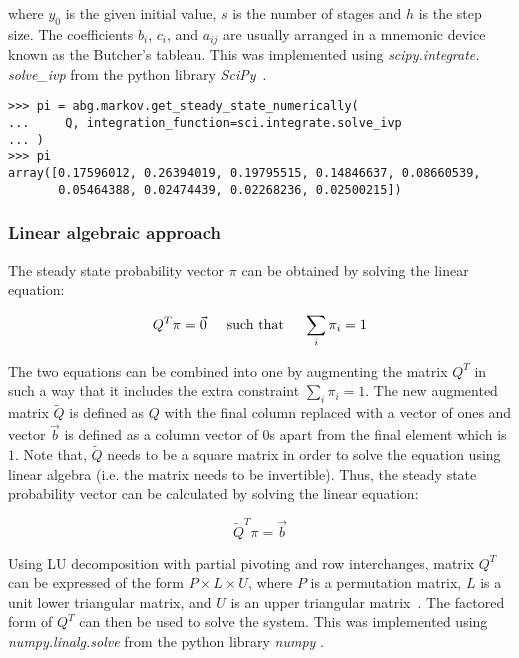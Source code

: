 where \(y_0\) is the given initial value, \(s\) is the number of stages and
\(h\) is the step size.
The coefficients \(b_i\), \(c_i\), and \(a_{ij}\) are usually arranged in a
mnemonic device known as the Butcher's tableau.
This was implemented using \textit{scipy.integrate. solve\_ivp} from the python
library \textit{SciPy}~\cite{2020SciPy-NMeth}.

\begin{lstlisting}[style=pystyle]
>>> pi = abg.markov.get_steady_state_numerically(
...     Q, integration_function=sci.integrate.solve_ivp
... )
>>> pi
array([0.17596012, 0.26394019, 0.19795515, 0.14846637, 0.08660539,
       0.05464388, 0.02474439, 0.02268236, 0.02500215])

\end{lstlisting}


\subsubsection{Linear algebraic approach}

The steady state probability vector \( \pi \) can be obtained by solving the
linear equation:

\begin{equation}\label{eq:numpy_linalg_solve_1}
    Q^T \pi = \vec{0} \hspace{0.5cm} \text{such that} \hspace{0.5cm}
    \sum_{i} \pi_i = 1
\end{equation}

The two equations can be combined into one by augmenting the matrix \( Q^T \)
in such a way that it includes the extra constraint \( \sum_i \pi_i = 1 \).
The new augmented matrix \(\tilde Q\) is defined as \(Q\) with the final
column replaced with a vector of ones and vector \(\vec{b}\) is defined
as a column vector of \(0\)s apart from the final element which is \(1\).
Note that, \(\tilde Q\) needs to be a square matrix in order to solve the
equation using linear algebra (i.e. the matrix needs to be invertible).
Thus, the steady state probability vector can be calculated by solving the
linear equation:

\begin{equation}
    \tilde Q^T \pi = \vec{b}
\end{equation}

Using LU decomposition with partial pivoting and row interchanges, matrix
\(Q^T\) can be expressed of the form \(P \times L \times U\), where \(P\) is
a permutation matrix, \(L\) is a unit lower triangular matrix, and \(U\) is
an upper triangular matrix~\cite{strang2006linear}.
The factored form of \(Q^T\) can then be used to solve the system.
This was implemented using \textit{numpy.linalg.solve} from the
python library \textit{numpy} \cite{2020NumPy-Array} \cite{lapack99}.


